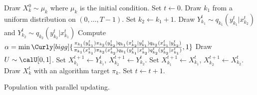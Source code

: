 \begin{algorithm}
\begin{algorithmic}
  \tophrule
    \STATE Draw $X_k^0\sim\mu_k$ where $\mu_k$ is the initial condition.
  \ENDFOR
  \STATE Set $t\leftarrow0$.
  \REPEAT
    \STATE Draw $k_1$ from a uniform distribution on $(0,\dots,T-1)$. Set
    $k_2\leftarrow k_1 + 1$.
    \STATE Draw $Y_{k_1}^t\sim q_{k_1}(y_{k_1}^t|x_{k_2}^t)$ and
    $Y_{k_2}^t\sim q_{k_2}(y_{k_2}^t|x_{k_1}^t)$
    \STATE Compute $\alpha = \min\Curly[bigg]{
      \frac{\pi_{k_1}(y_{k_1}^t)\pi_{k_2}(y_{k_2}^t)
        q_{k_1}(x_{k_2}^t|y_{k_1}^t)q_{k_2}(x_{k_1}^t|y_{k_2}^t)}
      {\pi_{k_1}(x_{k_1}^t)\pi_{k_2}(x_{k_2}^t)
        q_{k_1}(y_{k_1}^t|x_{k_2}^t)q_{k_2}^t(y_{k_2}^t|x_{k_1}^t)}, 1}$
    \STATE Draw $U\sim\calU[0,1]$.
      \STATE Set $X_{k_1}^{t+1}\leftarrow Y_{k_1}^t$, $X_{k_2}^{t+1}\leftarrow
          Y_{k_2}^t$.
    \ELSE
      \STATE Set $X_{k_1}^{t+1}\leftarrow X_{k_1}^t$, $X_{k_2}^{t+1}\leftarrow
          X_{k_2}^t$.
    \ENDIF
      \STATE Draw $X_k^t$ with an \mcmc algorithm target $\pi_k$.
    \ENDFOR
    \STATE Set $t\leftarrow t+1$.
  \bottomhrule
\end{algorithmic}
\caption{Population \mcmc with parallel updating.}
\label{alg:pmcmc}
\end{algorithm}
